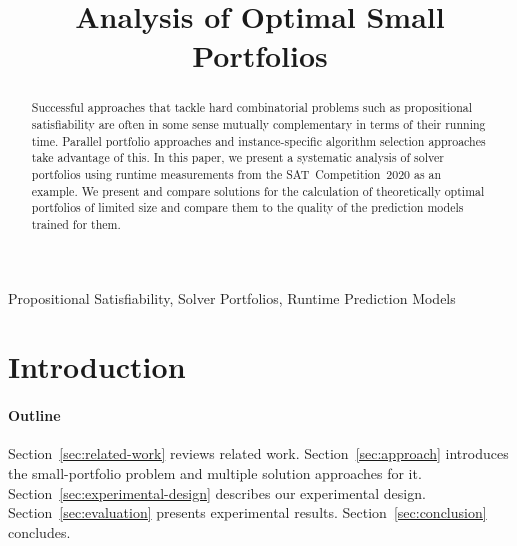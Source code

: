 \documentclass[conference]{IEEEtran}
\begin{document}
\title{Analysis of Optimal Small Portfolios}

\author{
\and
{}
}

\maketitle

\begin{abstract}
Successful approaches that tackle hard combinatorial problems such as propositional satisfiability are often in some sense mutually complementary in terms of their running time. 
Parallel portfolio approaches and instance-specific algorithm selection approaches take advantage of this. 
In this paper, we present a systematic analysis of solver portfolios using runtime measurements from the SAT~Competition~2020 as an example. 
We present and compare solutions for the calculation of theoretically optimal portfolios of limited size and compare them to the quality of the prediction models trained for them. 
\end{abstract}

\begin{IEEEkeywords}
Propositional Satisfiability, Solver Portfolios, Runtime Prediction Models
\end{IEEEkeywords}

\section{Introduction}
\label{sec:introduction}

\paragraph{Outline}

Section~\ref{sec:related-work} reviews related work.
Section~\ref{sec:approach} introduces the small-portfolio problem and multiple solution approaches for it.
Section~\ref{sec:experimental-design} describes our experimental design.
Section~\ref{sec:evaluation} presents experimental results.
Section~\ref{sec:conclusion} concludes.
\end{document}
